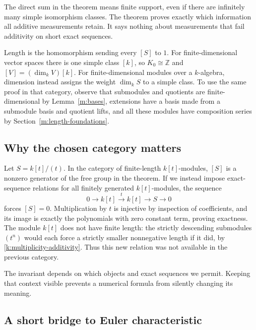 The direct sum in the theorem means finite support, even if there are
infinitely many simple isomorphism classes. The theorem proves exactly
which information all additive measurements retain. It says nothing
about measurements that fail additivity on short exact sequences.

Length is the homomorphism sending every $[S]$ to $1$. For
finite-dimensional vector spaces there is one simple class $[k]$,
so $K_0\cong\mathbb Z$ and $[V]=(\dim_kV)[k]$.
For finite-dimensional modules over a $k$-algebra, dimension instead
assigns the weight $\dim_k S$ to a simple class. To use the same proof
in that category, observe that submodules and quotients are finite-dimensional
by Lemma~\ref{m:bases}, extensions have a basis made from a submodule
basis and quotient lifts, and all these modules have composition series
by Section~\ref{m:length-foundations}.

\subsection{Why the chosen category matters}

Let $S=k[t]/(t)$. In the category of finite-length $k[t]$-modules,
$[S]$ is a nonzero generator of the free group in the theorem.
If we instead impose exact-sequence relations for all finitely generated
$k[t]$-modules, the sequence
\[
0\longrightarrow k[t]\xrightarrow{\,t\,}k[t]
\longrightarrow S\longrightarrow0
\]
forces $[S]=0$. Multiplication by $t$ is injective by inspection of
coefficients, and its image is exactly the polynomials with zero
constant term, proving exactness. The module $k[t]$ does not have
finite length: the strictly descending submodules $(t^n)$ would each
force a strictly smaller nonnegative length if it did, by
\eqref{k:multiplicity-additivity}. Thus this new relation was not
available in the previous category.

The invariant depends on which objects and exact sequences we permit.
Keeping that context visible prevents a numerical formula from
silently changing its meaning.

\subsection{A short bridge to Euler characteristic}
\label{k:euler}

